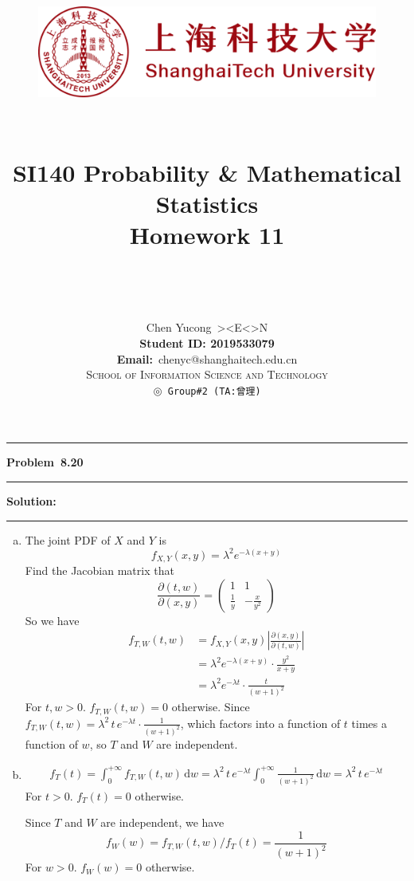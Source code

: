 \documentclass[10.5pt]{article}
\title{
	\normalfont \normalsize
	\begin{figure}[!h]
	\centering
	\includegraphics[width=4.8in, keepaspectratio]{logo_red.pdf}\\[1cm]
	\end{figure}
	\horrule{0.5pt} \\[0.4cm]
	\Huge SI140 Probability \& Mathematical Statistics\\[0.4cm]
	\LARGE Homework 11\\
	\horrule{2pt} \\[1.5cm]
}
\author{\Song{\huge\textbf{陈昱聪}}\\[0.2cm]Chen Yucong\ ><E<>N\\[4.5cm]\textbf{Student ID: 2019533079}\\[0.2cm] 
\textbf{Email:}\ {\ttfamily chenyc@shanghaitech.edu.cn}\\[0.8cm] \LARGE\textsc{School of Information Science and Technology}\\[0.63cm]
\texttt{$\circledcirc$ Group\#2\ (TA:曾理)}}
\date{}
\newcommand\question[1]{\vspace{.2in}\hrule\vspace{0.04in}\textbf{Problem\ #1}\vspace{.4em}\hrule\vspace{.10in}}
\newcommand\Solution{\vspace{.3in}\textbf{Solution:}\vspace{.5em}\hrule\vspace{.08in}\par}
\begin{document}
	
\maketitle
\thispagestyle{firstpage}
\thispagestyle{empty}
\setcounter{page}{0}

\question{8.20}
\Solution{}
\begin{enumerate}[(a)]
	\item The joint PDF of $X$ and $Y$ is
	$$f_{X,Y}(x, y) = \lambda^2 e^{-\lambda(x+y)}$$
	Find the Jacobian matrix that
	$$\frac{\partial(t, w)}{\partial(x, y)} = \begin{pmatrix}
	1 & 1	\\ \frac{1}{y}&-\frac{x}{y^2}
	\end{pmatrix}$$
	So we have\begin{align*}
		f_{T, W}(t, w) 
		&= f_{X,Y}(x, y)\left|\frac{\partial(x, y)}{\partial(t, w)}\right|\\[8pt]
		&= \lambda^2 e^{-\lambda(x+y)}\cdot\frac{y^2}{x+y}\\[8pt]
		&= \lambda^2 e^{-\lambda t}\cdot\frac{t}{(w+1)^2}
	\end{align*}
	For $t, w>0$. $f_{T, W}(t, w) = 0$ otherwise.
	Since $f_{T, W}(t, w) = \lambda^2\, t\, e^{-\lambda t}\cdot\frac{1}{(w+1)^2}$, which factors into a function of $t$ times a function of $w$, so $T$ and $W$ are independent.\vspace{2cm}
	\item \begin{align*}
		f_T(t) 
		= \int_{0}^{+\infty}f_{T, W}(t, w)\, \mathrm{d}w= \lambda^2\, t\, e^{-\lambda t}\int_{0}^{+\infty}\frac{1}{(w+1)^2}\, \mathrm{d}w= \lambda^2\, t\, e^{-\lambda t}
	\end{align*}
	For $t>0$. $f_T(t) = 0$ otherwise.

	Since $T$ and $W$ are independent, we have$$f_W(w) = f_{T, W}(t, w)/f_T(t) = \frac{1}{(w+1)^2}$$
	For $w>0$. $f_W(w) = 0$ otherwise.
\end{enumerate}
\end{document}

